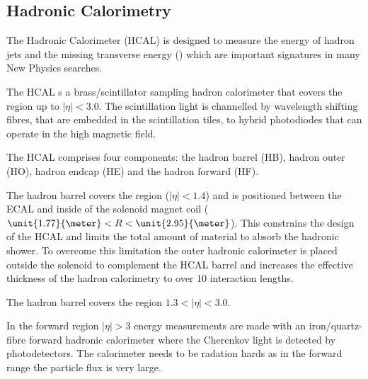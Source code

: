 
\subsection{Hadronic Calorimetry}

The Hadronic Calorimeter (HCAL) is designed to measure the energy of
hadron jets and the missing transverse energy (\met) which are important
signatures in many New Physics searches.

The HCAL s a brass/scintillator sampling hadron calorimeter that covers the
region up to $|\eta|<3.0$.
The scintillation light is channelled by wavelength shifting fibres, that are
embedded in the scintillation tiles, to hybrid photodiodes that can operate in
the high magnetic field. \cite{cms}

The HCAL comprises four components: the hadron barrel (HB), hadron outer (HO),
hadron endcap (HE) and the hadron forward (HF).

The hadron barrel covers the region ($|\eta| < 1.4$) and is positioned between
the ECAL and inside of the solenoid magnet coil
($\unit{1.77}{\meter}<R<\unit{2.95}{\meter}$).
This constrains the design of the HCAL and limits the total amount of material
to absorb the hadronic shower. 
To overcome this limitation the outer hadronic calorimeter is
placed outside the solenoid to complement the HCAL barrel and increases the
effective thickness of the hadron calorimetry to over 10 interaction lengths.

The hadron barrel covers the region $1.3 < |\eta| < 3.0$.

In the forward region $|\eta| > 3$ energy measurements are made with an
iron/quartz-fibre forward hadronic calorimeter where the Cherenkov light is
detected by photodetectors. The calorimeter needs to be radation hards as in the
forward range the particle flux is very large.


